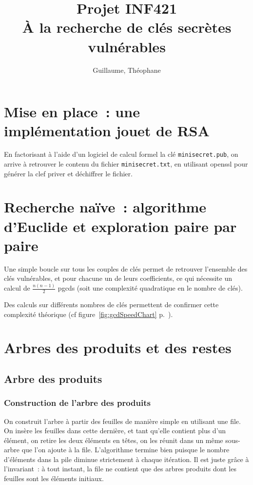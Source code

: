 \documentclass[a4paper,10pt]{article}
\title{Projet INF421 \\ À la recherche de clés secrètes vulnérables}
\author{\bsc{Hétier} Guillaume, \bsc{Hufschmitt} Théophane}
\begin{document}
\maketitle

\section{Mise en place~: une implémentation jouet de RSA}
En factorisant à l'aide d'un logiciel de calcul formel la clé \texttt{minisecret.pub}, on arrive à retrouver le contenu du fichier \texttt{minisecret.txt}, en utilisant openssl pour générer la clef priver et déchiffrer le fichier.


\section{Recherche naïve~: algorithme d'Euclide et exploration paire par paire}
Une simple boucle sur tous les couples de clés permet de retrouver l'ensemble des clés vulnérables, et pour chacune un de leurs coefficients, ce qui nécessite un calcul de $\frac{n(n-1)}{2}$ pgcds (soit une complexité quadratique en le nombre de clés).

Des calculs sur différents nombres de clés permettent de confirmer cette complexité théorique (cf figure~\ref{fig:gcdSpeedChart} p.~\pageref{fig:gcdSpeedChart}).
  
  
\section{Arbres des produits et des restes}

  \subsection{Arbre des produits}
  \subsubsection{Construction de l'arbre des produits}
  On construit l'arbre à partir des feuilles de manière simple en utilisant une file. On insère les feuilles dans cette dernière, et tant qu'elle contient plus d'un élément, on retire les deux éléments en têtes, on les réunit dans un même sous-arbre que l'on ajoute à la file.
  L'algorithme termine bien puisque le nombre d'éléments dans la pile diminue strictement à chaque itération. Il est juste grâce à l'invariant~: à tout instant, la file ne contient que des arbres produits dont les feuilles sont les éléments initiaux.
  
\end{document}
